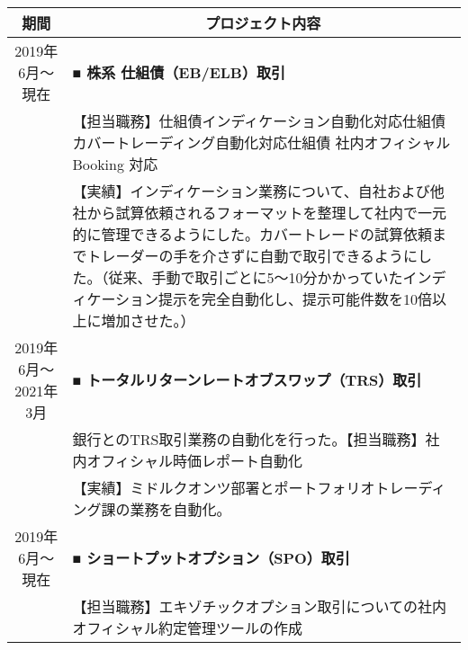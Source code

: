 \documentclass[uplatex,a4j,10.5pt,dvipdfmx]{jsarticle}
\begin{document}
\begin{longtable}{|c|p{14cm}|}
	\hline
	\multicolumn{1}{|c|}{\textbf{期間}} & \multicolumn{1}{c|}{\textbf{プロジェクト内容}}                                                                                                                                  \\
	\hline
	\endhead

	\hline

	2019年6月～現在                        & \textbf{■ 株系 仕組債（EB/ELB）取引}                                                                                                                                             \\
	                                  & 【担当職務】仕組債インディケーション自動化対応仕組債カバートレーディング自動化対応仕組債 社内オフィシャルBooking 対応                                                                                                         \\
	                                  & 【実績】インディケーション業務について、自社および他社から試算依頼されるフォーマットを整理して社内で一元的に管理できるようにした。カバートレードの試算依頼までトレーダーの手を介さずに自動で取引できるようにした。（従来、手動で取引ごとに5～10分かかっていたインディケーション提示を完全自動化し、提示可能件数を10倍以上に増加させた。） \\
	\hline
	2019年6月～2021年3月                   & \textbf{■ トータルリターンレートオブスワップ（TRS）取引}                                                                                                                                     \\
	                                  & 銀行とのTRS取引業務の自動化を行った。【担当職務】社内オフィシャル時価レポート自動化                                                                                                                             \\
	                                  & 【実績】ミドルクオンツ部署とポートフォリオトレーディング課の業務を自動化。                                                                                                                                   \\
	\hline
	2019年6月～現在                        & \textbf{■ ショートプットオプション（SPO）取引}                                                                                                                                          \\
	                                  & 【担当職務】エキゾチックオプション取引についての社内オフィシャル約定管理ツールの作成                                                                                                                              \\

\end{longtable}
\end{document}

